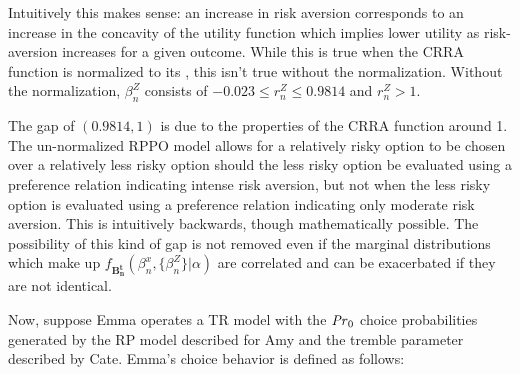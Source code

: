 \documentclass[../main.tex]{subfiles}
\begin{document}
Intuitively this makes sense: an increase in risk aversion corresponds to an increase in the concavity of the utility function which implies lower utility as risk-aversion increases for a given outcome.
While this is true when the CRRA function is normalized to its {\CE}, this isn't true without the normalization.
Without the normalization, $\beta_n^Z$ consists of $-0.023 \leq r_n^Z \leq 0.9814$ and $r_n^Z > 1$.

The gap of $(0.9814,1)$ is due to the properties of the CRRA function around 1.
The un-normalized RPPO model allows for a relatively risky option to be chosen over a relatively less risky option should the less risky option be evaluated using a preference relation indicating intense risk aversion, but not when the less risky option is evaluated using a preference relation indicating only moderate risk aversion.
This is intuitively backwards, though mathematically possible.
The possibility of this kind of gap is not removed even if the marginal distributions which make up $f_{\mathbf{B^t_n}}(\beta_n^x,\{\beta_n^Z\}|\alpha)$ are correlated and can be exacerbated if they are not identical.

Now, suppose Emma operates a TR model with the ${\mathit{Pr}}_0$ choice probabilities generated by the RP model described for Amy and the tremble parameter described by Cate.
Emma's choice behavior is defined as follows:
\end{document}
